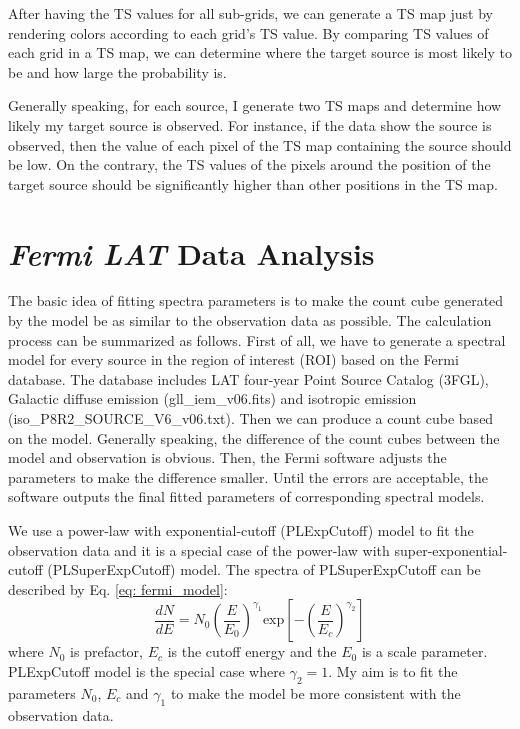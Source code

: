 \documentclass[12pt]{report}
\begin{document}
          After having the TS values for all sub-grids, we can generate a TS map just by 
          rendering colors according to each grid's TS value. By comparing TS values of 
          each grid in a TS map, we can determine where the target source is most likely to 
          be and how large the probability is. 
          
          Generally speaking, for each source, I generate two TS maps and determine how likely 
          my target source is observed. For instance, if the data show the source is observed, 
          then the value of each pixel of the TS map containing the source should be low. 
          On the contrary, the TS values of the pixels around the position of the target 
          source should be significantly higher than other positions in the TS map.
       
        \section{\textit{Fermi LAT} Data Analysis}
          The basic idea of fitting spectra parameters is to make the count cube generated by 
          the model be as similar to the observation data as possible. The calculation process 
          can be summarized as follows. First of all, we have to generate a spectral model 
          for every source in the region of interest (ROI) based on the Fermi database.
          The database includes LAT four-year Point Source Catalog (3FGL), Galactic 
          diffuse emission (gll\_iem\_v06.fits) and isotropic emission 
          (iso\_P8R2\_SOURCE\_V6\_v06.txt). Then we can produce a count cube based on the 
          model. Generally speaking, the difference of the count cubes between the model and 
          observation is obvious. Then, the Fermi software adjusts the parameters 
          to make the difference smaller. Until the errors are acceptable, the software 
          outputs the final fitted parameters of corresponding spectral models.  

          We use a power-law with exponential-cutoff (PLExpCutoff) model to fit the 
          observation data and it is a special case of the power-law with 
          super-exponential-cutoff (PLSuperExpCutoff) model. The spectra of PLSuperExpCutoff 
          can be described by Eq. \ref{eq: fermi_model}:  
          \begin{equation} 
            \label{eq: fermi_model}
            \frac{dN}{dE} = N_{0} \left(\frac{E}{E_0}\right)^{\gamma_1}\mbox{exp}\left[-\left(\frac{E}{E_c}\right)^{\gamma_2}\right]
          \end{equation}  
          where $N_0$ is prefactor, $E_c$ is the cutoff energy and the $E_0$ is a scale 
          parameter. PLExpCutoff model is the special case where $\gamma_2=1$. My aim is to 
          fit the parameters $N_0$, $E_c$ and $\gamma_1$ to make the model be more 
          consistent with the observation data.
\end{document}

